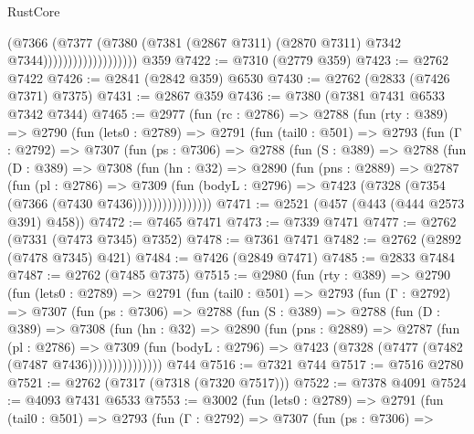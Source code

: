 \begin{lexlean}{RustCore}
\begin{coremodule}
                                  (@7366
                                    (@7377
                                      (@7380
                                        (@7381
                                          (@2867 @7311)
                                          (@2870 @7311)
                                          @7342
                                          @7344)))))))))))))))))))
    @359
@7422 := @7310 (@2779 @359)
@7423 := @2762 @7422
@7426 := @2841 (@2842 @359) @6530
@7430 := @2762 (@2833 (@7426 @7371) @7375)
@7431 := @2867 @359
@7436 := @7380 (@7381 @7431 @6533 @7342 @7344)
@7465 := @2977
    (fun (rc : @2786) =>
    @2788
      (fun (rty : @389) =>
      @2790
        (fun (lets0 : @2789) =>
        @2791
          (fun (tail0 : @501) =>
          @2793
            (fun (Γ : @2792) =>
            @7307
              (fun (ps : @7306) =>
              @2788
                (fun (S : @389) =>
                @2788
                  (fun (D : @389) =>
                  @7308
                    (fun (hn : @32) =>
                    @2890
                      (fun (pns : @2889) =>
                      @2787
                        (fun (pl : @2786) =>
                        @7309
                          (fun (bodyL : @2796) =>
                          @7423 (@7328 (@7354 (@7366 (@7430 @7436))))))))))))))))
@7471 := @2521 (@457 (@443 (@444 @2573 @391) @458))
@7472 := @7465 @7471
@7473 := @7339 @7471
@7477 := @2762 (@7331 (@7473 @7345) @7352)
@7478 := @7361 @7471
@7482 := @2762 (@2892 (@7478 @7345) @421)
@7484 := @7426 (@2849 @7471)
@7485 := @2833 @7484
@7487 := @2762 (@7485 @7375)
@7515 := @2980
    (fun (rty : @389) =>
    @2790
      (fun (lets0 : @2789) =>
      @2791
        (fun (tail0 : @501) =>
        @2793
          (fun (Γ : @2792) =>
          @7307
            (fun (ps : @7306) =>
            @2788
              (fun (S : @389) =>
              @2788
                (fun (D : @389) =>
                @7308
                  (fun (hn : @32) =>
                  @2890
                    (fun (pns : @2889) =>
                    @2787
                      (fun (pl : @2786) =>
                      @7309
                        (fun (bodyL : @2796) =>
                        @7423 (@7328 (@7477 (@7482 (@7487 @7436)))))))))))))))
    @744
@7516 := @7321 @744
@7517 := @7516 @2780
@7521 := @2762 (@7317 (@7318 (@7320 @7517)))
@7522 := @7378 @4091
@7524 := @4093 @7431 @6533
@7553 := @3002
    (fun (lets0 : @2789) =>
    @2791
      (fun (tail0 : @501) =>
      @2793
        (fun (Γ : @2792) =>
        @7307
          (fun (ps : @7306) =>

\end{coremodule}
\end{lexlean}
